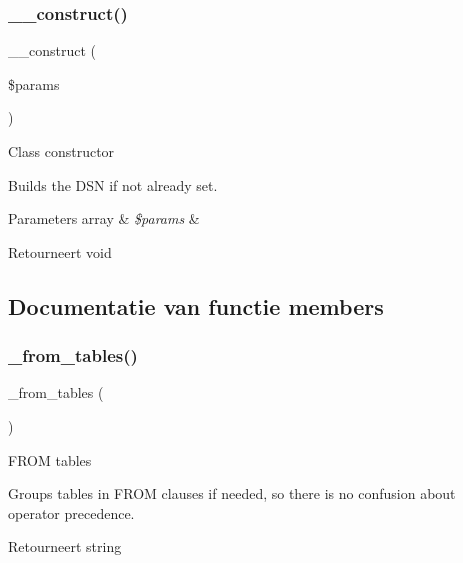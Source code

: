 \subsubsection{\texorpdfstring{\_\_construct()}{\_\_construct()}}
{\footnotesize\ttfamily \+\_\+\+\_\+construct (\begin{DoxyParamCaption}\item[{}]{\$params }\end{DoxyParamCaption})}

Class constructor

Builds the D\+SN if not already set.


\begin{DoxyParams}[1]{Parameters}
array & {\em \$params} & \\
\hline
\end{DoxyParams}
\begin{DoxyReturn}{Retourneert}
void 
\end{DoxyReturn}


\subsection{Documentatie van functie members}
\mbox{\label{class_c_i___d_b__pdo__mysql__driver_aef43f7e3e7b71d337ff3724c5eb14f10}} 
\subsubsection{\texorpdfstring{\_from\_tables()}{\_from\_tables()}}
{\footnotesize\ttfamily \+\_\+from\+\_\+tables (\begin{DoxyParamCaption}{ }\end{DoxyParamCaption})\hspace{0.3cm}{\ttfamily [protected]}}

F\+R\+OM tables

Groups tables in F\+R\+OM clauses if needed, so there is no confusion about operator precedence.

\begin{DoxyReturn}{Retourneert}
string 
\end{DoxyReturn}
\mbox{\label{class_c_i___d_b__pdo__mysql__driver_a7ccb7f9c301fe7f0a9db701254142b63}} 
